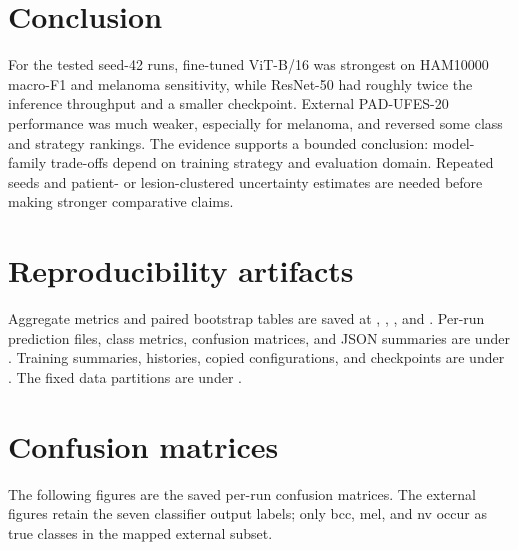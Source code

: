 \documentclass[11pt]{article}
\begin{document}
\section{Conclusion}

For the tested seed-42 runs, fine-tuned ViT-B/16 was strongest on HAM10000 macro-F1 and melanoma sensitivity, while ResNet-50 had roughly twice the inference throughput and a smaller checkpoint. External PAD-UFES-20 performance was much weaker, especially for melanoma, and reversed some class and strategy rankings. The evidence supports a bounded conclusion: model-family trade-offs depend on training strategy and evaluation domain. Repeated seeds and patient- or lesion-clustered uncertainty estimates are needed before making stronger comparative claims.

\section*{Reproducibility artifacts}

Aggregate metrics and paired bootstrap tables are saved at , , , and . Per-run prediction files, class metrics, confusion matrices, and JSON summaries are under . Training summaries, histories, copied configurations, and checkpoints are under . The fixed data partitions are under .

\appendix
\section{Confusion matrices}

The following figures are the saved per-run confusion matrices. The external figures retain the seven classifier output labels; only bcc, mel, and nv occur as true classes in the mapped external subset.
\end{document}
